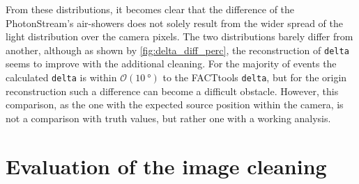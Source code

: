 %
From these distributions, it becomes clear that the difference of the
PhotonStream's air-showers does not solely result from the wider spread of
the light distribution over the camera pixels. The two distributions barely
differ from another, although as shown by \autoref{fig:delta_diff_perc}, the
reconstruction of \texttt{delta} seems to improve with the additional
cleaning. For the majority of events the calculated \texttt{delta} is within
$\mathcal{O}(\SI{10}{\degree})$ to the FACTtools \texttt{delta}, but for the
origin reconstruction such a difference can become a difficult obstacle.
However, this comparison, as the one with the expected source position
within the camera, is not a comparison with truth values, but rather one
with a working analysis.


\section{Evaluation of the image cleaning}
%
